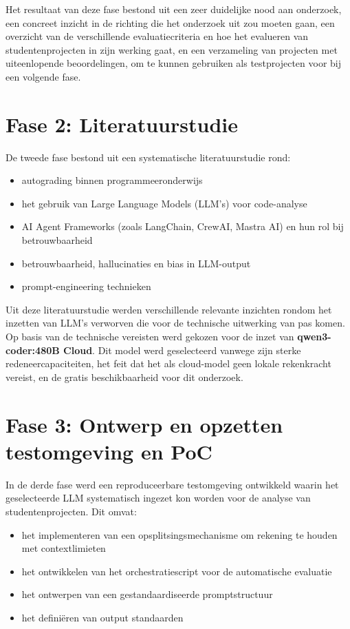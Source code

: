 Het resultaat van deze fase bestond uit een zeer duidelijke nood aan onderzoek, een concreet inzicht in de richting die het onderzoek uit zou moeten gaan, een overzicht van de verschillende evaluatiecriteria en hoe het evalueren van studentenprojecten in zijn werking gaat, en een verzameling van projecten met uiteenlopende beoordelingen, om te kunnen gebruiken als testprojecten voor bij een volgende fase.

\section{Fase 2: Literatuurstudie}

De tweede fase bestond uit een systematische literatuurstudie rond:
\begin{itemize}
    \item autograding binnen programmeeronderwijs
    \item het gebruik van Large Language Models (LLM's) voor code-analyse
    \item AI Agent Frameworks (zoals LangChain, CrewAI, Mastra AI) en hun rol bij betrouwbaarheid
    \item betrouwbaarheid, hallucinaties en bias in LLM-output
    \item prompt-engineering technieken
\end{itemize}

Uit deze literatuurstudie werden verschillende relevante inzichten rondom het inzetten van LLM's verworven die voor de technische uitwerking van pas komen. Op basis van de technische vereisten werd gekozen voor de inzet van \textbf{qwen3-coder:480B Cloud}. Dit model werd geselecteerd vanwege zijn sterke redeneercapaciteiten, het feit dat het als cloud-model geen lokale rekenkracht vereist, en de gratis beschikbaarheid voor dit onderzoek.

\section{Fase 3: Ontwerp en opzetten testomgeving en PoC}

In de derde fase werd een reproduceerbare testomgeving ontwikkeld waarin het geselecteerde LLM systematisch ingezet kon worden voor de analyse van studentenprojecten. Dit omvat:
\begin{itemize}
    \item het implementeren van een opsplitsingsmechanisme om rekening te houden met contextlimieten
    \item het ontwikkelen van het orchestratiescript voor de automatische evaluatie
    \item het ontwerpen van een gestandaardiseerde promptstructuur
    \item het definiëren van output standaarden
\end{itemize}

